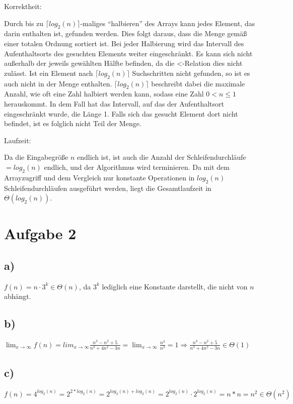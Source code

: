 \documentclass[a4paper,10pt,freqn]{article}
\begin{document}
\begin{bfseries}Korrektheit:\end{bfseries}\newline
Durch bis zu $\lceil log_{2}(n)\rceil$-maliges ``halbieren'' des Arrays kann jedes Element, das darin enthalten ist,
gefunden werden. Dies folgt daraus, dass die Menge gemäß einer totalen Ordnung sortiert ist. Bei jeder Halbierung wird
das Intervall des Aufenthaltsorts des gesuchten Elements weiter eingeschränkt. Es kann sich nicht außerhalb der
jeweils gewählten Hälfte befinden, da die <-Relation dies nicht zulässt. Ist ein Element nach $\lceil log_{2}(n)\rceil$
Suchschritten nicht gefunden, so ist es auch nicht in der Menge enthalten. $\lceil log_{2}(n)\rceil$ beschreibt dabei
die maximale Anzahl, wie oft eine Zahl halbiert werden kann, sodass eine Zahl $0<n\leq1$ herauskommt. In dem Fall hat
das Intervall, auf das der Aufenthaltsort eingeschränkt wurde, die Länge 1. Falls sich das gesucht Element dort nicht
befindet, ist es folglich nicht Teil der Menge.

\begin{bfseries}Laufzeit:\end{bfseries}\newline
Da die Eingabegröße $n$ endlich ist, ist auch die Anzahl der Schleifendurchläufe $= log_{2}(n)$ endlich,
und der Algorithmus wird terminieren. Da mit dem Arrayzugriff und dem Vergleich nur konstante Operationen
in $log_{2}(n)$ Schleifendurchläufen ausgeführt werden, liegt die Gesamtlaufzeit in $\Theta(log_{2}(n))$.

\section*{Aufgabe 2}
\subsection*{a)}
$f(n)=n\cdot3^{k} \in \Theta(n)$, da $3^k$ lediglich eine Konstante darstellt, die nicht von $n$ abhängt.

\subsection*{b)}
$\lim_{x \to \infty}f(n) = lim_{x \to \infty}\frac{n^3-n^2+5}{n^3+4n^2-3n} = \lim_{x \to \infty}\frac{n^3}{n^3} = 1 \Rightarrow
\frac{n^3-n^2+5}{n^3+4n^2-3n} \in \Theta(1)$

\subsection*{c)}
$f(n) = 4^{log_{2}(n)} = 2^{2*log_{2}(n)} = 2^{log_{2}(n) +log_{2}(n)} = 2^{log_{2}(n)}\cdot2^{log_{2}(n)} = n*n
 = n^2 \in \Theta(n^2)$
 
\end{document}
